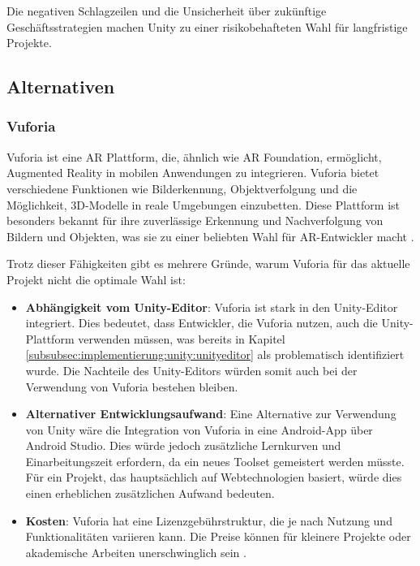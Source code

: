 Die negativen Schlagzeilen und die Unsicherheit über zukünftige Geschäftsstrategien machen Unity zu einer risikobehafteten Wahl für langfristige Projekte.

\subsection{Alternativen}

\subsubsection{Vuforia}

Vuforia ist eine AR Plattform, die, ähnlich wie AR Foundation, ermöglicht, Augmented Reality in mobilen Anwendungen zu integrieren. Vuforia bietet verschiedene Funktionen wie Bilderkennung, Objektverfolgung und die Möglichkeit, 3D-Modelle in reale Umgebungen einzubetten. Diese Plattform ist besonders bekannt für ihre zuverlässige Erkennung und Nachverfolgung von Bildern und Objekten, was sie zu einer beliebten Wahl für AR-Entwickler macht \autocite{Vuforia2024:Features}.

Trotz dieser Fähigkeiten gibt es mehrere Gründe, warum Vuforia für das aktuelle Projekt nicht die optimale Wahl ist:

\begin{itemize}
    \item \textbf{Abhängigkeit vom Unity-Editor}: Vuforia ist stark in den Unity-Editor integriert. Dies bedeutet, dass Entwickler, die Vuforia nutzen, auch die Unity-Plattform verwenden müssen, was bereits in Kapitel \ref{subsubsec:implementierung:unity:unityeditor} als problematisch identifiziert wurde. Die Nachteile des Unity-Editors würden somit auch bei der Verwendung von Vuforia bestehen bleiben.
    \item \textbf{Alternativer Entwicklungsaufwand}: Eine Alternative zur Verwendung von Unity wäre die Integration von Vuforia in eine Android-App über Android Studio. Dies würde jedoch zusätzliche Lernkurven und Einarbeitungszeit erfordern, da ein neues Toolset gemeistert werden müsste. Für ein Projekt, das hauptsächlich auf Webtechnologien basiert, würde dies einen erheblichen zusätzlichen Aufwand bedeuten.
    \item \textbf{Kosten}: Vuforia hat eine Lizenzgebührstruktur, die je nach Nutzung und Funktionalitäten variieren kann. Die Preise können für kleinere Projekte oder akademische Arbeiten unerschwinglich sein \autocite{Vuforia2024:Pricing}.
\end{itemize}

